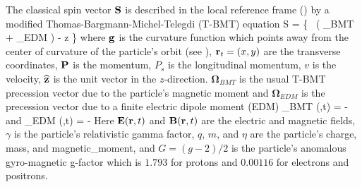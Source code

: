 The classical spin vector ${\bf S}$ is described in the local reference
frame () by a modified Thomas-Bargmann-Michel-Telegdi
(T-BMT) equation\cite{b:spin}
\Begineq
   \Bf S = 
  \left\{  \, 
  \left( {\pmb\Omega}_{BMT} + {\pmb\Omega}_{EDM} \right) - 
  \bfg \times \bfhat z \right\} \times {}
\Endeq
where ${\bf g}$ is the curvature function which points away from the
center of curvature of the particle's orbit (see
), ${\bf r}_t = (x, y)$ are the transverse
coordinates, ${\bf P}$ is the momentum, $P_s$ is the longitudinal momentum,
$v$ is the velocity, ${\widehat{\bf z}}$ is the unit vector in the
$z$-direction. $\pmb\Omega_{BMT}$ is the usual T-BMT precession vector
due to the particle's magnetic moment and $\pmb\Omega_{EDM}$ is the
precession vector due to a finite electric dipole moment (EDM) \cite{b:silenko}
\Begineq
  {\pmb\Omega}_{BMT} (,t) = 
    -  
\Endeq
and
\Begineq
  {\pmb\Omega}_{EDM} (,t) = 
  -  
\Endeq
Here ${\bf E} ({\bf r} ,t)$ and ${\bf B} ({\bf r} ,t)$ are the electric and
magnetic fields, $\gamma$ is the particle's relativistic gamma factor,
$q$, $m$, and $\eta$ are the particle's charge, mass, and
magnetic_moment, and $G = (g-2)/2$ is the particle's anomalous
gyro-magnetic g-factor which is $1.793$ for protons and $0.00116$ for
electrons and positrons.
   
